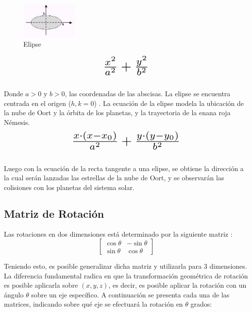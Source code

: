 \documentclass[journal]{IEEEtran}
\begin{document}
\begin{figure}[h!]
	\includegraphics[width=0.25\textwidth, height=0.25\textwidth]{elipse.png}
	\centering
	\caption{Elipse}
\end{figure}

\[ \scalebox{2}{$\frac{x^{2}}{a^{2}} + \frac{y^{2}}{b^{2}}$} \]\\

Donde $a>0$ y $b>0$, las coordenadas de las abscisas. La elipse se encuentra centrada en el origen ($h,k=0$) \cite{enciclopedia}. La ecuación de la elipse modela la ubicación de la nube de Oort y la órbita de los planetas, y la trayectoria de la enana roja Némesis.\\

\[ \scalebox{2}{$ \frac{x\cdot(x-x_{0})}{a^{2}} + \frac{y\cdot(y-y_{0})}{b^{2}}$} \]\\

Luego con la ecuación de la recta tangente a una elipse, se obtiene la dirección a la cual serán lanzadas las estrellas de la nube de Oort, y se observarán las colisiones con los planetas del sistema solar.

\subsection{Matriz de Rotación}

Las rotaciones en dos dimensiones está determinado por la siguiente matriz \cite{foley}:\\
\[ 
	\left[ 
		\begin{array}{cc}
			\cos\theta & -\sin\theta \\
			\sin\theta & \cos\theta
		\end{array}
	\right]
\]

Teniendo esto, es posible generalizar dicha matriz y utilizarla para 3 dimensiones. La diferencia fundamental  radica en que la transformación geométrica de rotación es posible aplicarla sobre $(x,y,z)$, es decir, es posible aplicar la rotación con un ángulo $\theta$ sobre un eje específico. A continuación se presenta cada una de las matrices, indicando sobre qué eje se efectuará la rotación en $\theta$ grados:
\end{document}
